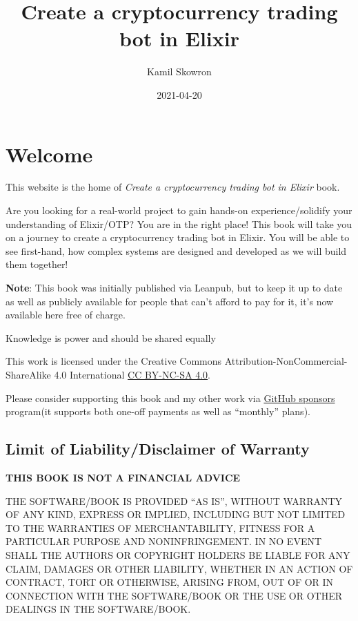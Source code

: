 \documentclass[
]{book}
\title{Create a cryptocurrency trading bot in Elixir}
\author{Kamil Skowron}
\date{2021-04-20}
\begin{document}
\maketitle

{
\setcounter{tocdepth}{1}
\tableofcontents
}
\hypertarget{welcome}{%
\chapter*{Welcome 👋}\label{welcome}}

This website is the home of \emph{Create a cryptocurrency trading bot in Elixir} book.

Are you looking for a real-world project to gain hands-on experience/solidify your understanding of Elixir/OTP? You are in the right place! This book will take you on a journey to create a cryptocurrency trading bot in Elixir. You will be able to see first-hand, how complex systems are designed and developed as we will build them together!

\textbf{Note}: This book was initially published via Leanpub, but to keep it up to date as well as publicly available for people that can't afford to pay for it, it's now available here free of charge.

Knowledge is power and should be shared equally 🙏

This work is licensed under the Creative Commons Attribution-NonCommercial-ShareAlike 4.0 International \href{https://creativecommons.org/licenses/by-nc-sa/4.0/}{CC BY-NC-SA 4.0}.

Please consider supporting this book and my other work via \href{https://github.com/sponsors/frathon}{GitHub sponsors} program(it supports both one-off payments as well as ``monthly'' plans).

\hypertarget{limit-of-liabilitydisclaimer-of-warranty}{%
\section*{Limit of Liability/Disclaimer of Warranty}\label{limit-of-liabilitydisclaimer-of-warranty}}

\textbf{THIS BOOK IS NOT A FINANCIAL ADVICE}

THE SOFTWARE/BOOK IS PROVIDED ``AS IS'', WITHOUT WARRANTY OF ANY KIND, EXPRESS OR IMPLIED, INCLUDING BUT NOT LIMITED TO THE WARRANTIES OF MERCHANTABILITY, FITNESS FOR A PARTICULAR PURPOSE AND NONINFRINGEMENT. IN NO EVENT SHALL THE AUTHORS OR COPYRIGHT HOLDERS BE LIABLE FOR ANY CLAIM, DAMAGES OR OTHER LIABILITY, WHETHER IN AN ACTION OF CONTRACT, TORT OR OTHERWISE, ARISING FROM, OUT OF OR IN CONNECTION WITH THE SOFTWARE/BOOK OR THE USE OR OTHER DEALINGS IN THE SOFTWARE/BOOK.
\end{document}

